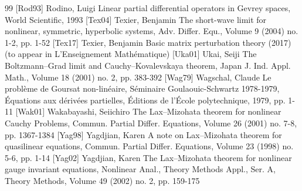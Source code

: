 \documentclass[10pt]{amsart}
\theoremstyle{definition}
\theoremstyle{plain}
\begin{document}
\begin{thebibliography}{99}
 [Rod93] Rodino, Luigi Linear partial differential operators in Gevrey spaces, World Scientific, 1993
 [Tex04] Texier, Benjamin The short-wave limit for nonlinear, symmetric, hyperbolic systems, Adv. Differ. Equ., Volume 9 (2004) no. 1-2, pp. 1-52
 [Tex17] Texier, Benjamin Basic matrix perturbation theory (2017) (to appear in L’Enseignement Mathématique)
 [Uka01] Ukai, Seiji The Boltzmann–Grad limit and Cauchy–Kovalevskaya theorem, Japan J. Ind. Appl. Math., Volume 18 (2001) no. 2, pp. 383-392
 [Wag79] Wagschal, Claude Le problème de Goursat non-linéaire, Séminaire Goulaouic-Schwartz 1978-1979, Équations aux dérivées partielles, Éditions de l’École polytechnique, 1979, pp. 1-11
 [Wak01] Wakabayashi, Seiichiro The Lax–Mizohata theorem for nonlinear Cauchy Problems, Commun. Partial Differ. Equations, Volume 26 (2001) no. 7-8, pp. 1367-1384
 [Yag98] Yagdjian, Karen A note on Lax–Mizohata theorem for quasilinear equations, Commun. Partial Differ. Equations, Volume 23 (1998) no. 5-6, pp. 1-14
 [Yag02] Yagdjian, Karen The Lax–Mizohata theorem for nonlinear gauge invariant equations, Nonlinear Anal., Theory Methods Appl., Ser. A, Theory Methods, Volume 49 (2002) no. 2, pp. 159-175
\end{thebibliography}
\end{document}
